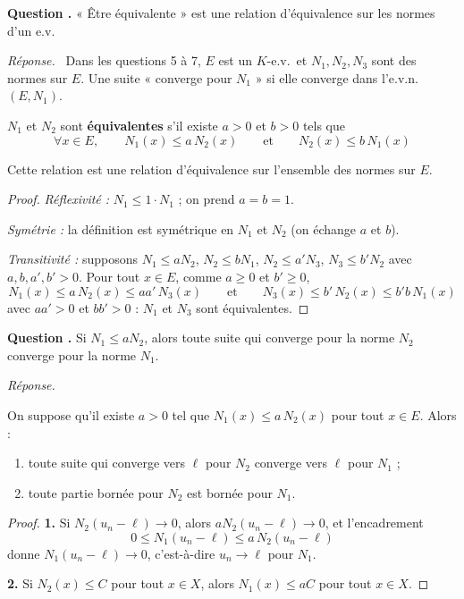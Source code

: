 \documentclass[11pt]{article}
\newcounter{qnum}
\newcommand{\question}[1]{%
\stepcounter{qnum}%
\bigskip
\noindent\textbf{Question \theqnum.} #1\par}
\newcommand{\reponse}{\noindent\textit{Réponse.}\ }
\begin{document}
\question{« Être équivalente » est une relation d'équivalence sur les normes d'un e.v.}
\reponse
Dans les questions 5 à 7, $E$ est un $K$-e.v.\ et $N_1,N_2,N_3$ sont des normes sur $E$. Une suite « converge pour $N_1$ » si elle converge dans l'e.v.n.\ $(E,N_1)$.

\begin{defi}
\label{defi:normes-equivalentes}
$N_1$ et $N_2$ sont \textbf{équivalentes} s'il existe $a>0$ et $b>0$ tels que
\[\forall x\in E,\qquad N_1(x)\leq a\,N_2(x)\qquad\text{et}\qquad N_2(x)\leq b\,N_1(x)\]
\end{defi}

\begin{prop}
\label{prop:normes-equivalentes-relation}
Cette relation est une relation d'équivalence sur l'ensemble des normes sur $E$.
\end{prop}

\begin{proof}
\emph{Réflexivité :} $N_1\leq 1\cdot N_1$ ; on prend $a=b=1$.

\emph{Symétrie :} la définition est symétrique en $N_1$ et $N_2$ (on échange $a$ et $b$).

\emph{Transitivité :} supposons $N_1\leq aN_2$, $N_2\leq bN_1$, $N_2\leq a'N_3$, $N_3\leq b'N_2$ avec $a,b,a',b'>0$. Pour tout $x\in E$, comme $a\geq 0$ et $b'\geq 0$,
\[N_1(x)\leq a\,N_2(x)\leq aa'\,N_3(x)\qquad\text{et}\qquad N_3(x)\leq b'\,N_2(x)\leq b'b\,N_1(x)\]
avec $aa'>0$ et $bb'>0$ : $N_1$ et $N_3$ sont équivalentes.
\end{proof}

\question{Si $N_1\leq aN_2$, alors toute suite qui converge pour la norme $N_2$ converge pour la norme $N_1$.}
\reponse

\begin{prop}
\label{prop:comparaison-normes}
On suppose qu'il existe $a>0$ tel que $N_1(x)\leq a\,N_2(x)$ pour tout $x\in E$. Alors :
\begin{enumerate}
\item toute suite qui converge vers $\ell$ pour $N_2$ converge vers $\ell$ pour $N_1$ ;
\item toute partie bornée pour $N_2$ est bornée pour $N_1$.
\end{enumerate}
\end{prop}

\begin{proof}
\textbf{1.} Si $N_2(u_n-\ell)\to 0$, alors $aN_2(u_n-\ell)\to 0$, et l'encadrement
\[0\leq N_1(u_n-\ell)\leq a\,N_2(u_n-\ell)\]
donne $N_1(u_n-\ell)\to 0$, c'est-à-dire $u_n\to\ell$ pour $N_1$.

\textbf{2.} Si $N_2(x)\leq C$ pour tout $x\in X$, alors $N_1(x)\leq aC$ pour tout $x\in X$.
\end{proof}
\end{document}
